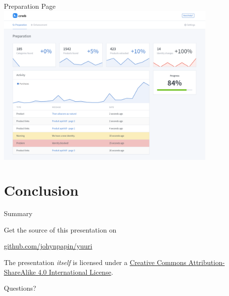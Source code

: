 \documentclass[10pt]{beamer}
\begin{document}
\begin{frame}{Preparation Page}
    \includegraphics[width=11cm]{preparation.png}
\end{frame}

\section{Conclusion}

\begin{frame}{Summary}

  Get the source of this presentation on

  \begin{center}\url{github.com/johynpapin/yuuri}\end{center}

  The presentation \emph{itself} is licensed under a
  \href{http://creativecommons.org/licenses/by-sa/4.0/}{Creative Commons
  Attribution-ShareAlike 4.0 International License}.

  \begin{center}\ccbysa\end{center}

\end{frame}

\begin{frame}[standout]
  Questions?
\end{frame}

\appendix
\end{document}

